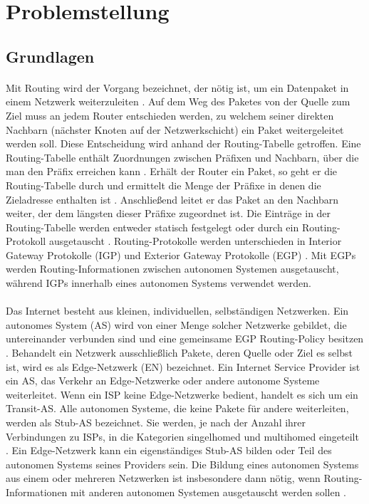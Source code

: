 \section{Problemstellung}

\subsection{Grundlagen}
\paragraph{}
Mit Routing wird der Vorgang bezeichnet, der nötig ist, um ein Datenpaket in einem Netzwerk weiterzuleiten \cite{Mahorta:2002:IR}. Auf dem Weg des Paketes von der Quelle zum Ziel muss an jedem Router entschieden werden, zu welchem seiner direkten Nachbarn (nächster Knoten auf der Netzwerkschicht) ein Paket weitergeleitet werden soll. Diese Entscheidung wird anhand der Routing-Tabelle getroffen. Eine Routing-Tabelle enthält Zuordnungen zwischen Präfixen und Nachbarn, über die man den Präfix erreichen kann \cite{Mahorta:2002:IR}. Erhält der Router ein Paket, so geht er die Routing-Tabelle durch und ermittelt die Menge der Präfixe in denen die Zieladresse enthalten ist \cite{Tanenbaum:2003:CN}. Anschließend leitet er das Paket an den Nachbarn weiter, der dem längsten dieser Präfixe zugeordnet ist. Die Einträge in der Routing-Tabelle werden entweder statisch festgelegt oder durch ein Routing-Protokoll ausgetauscht \cite{Mahorta:2002:IR}. Routing-Protokolle werden unterschieden in Interior Gateway Protokolle (IGP) und Exterior Gateway Protokolle (EGP) \cite{Tanenbaum:2003:CN}. Mit EGPs werden Routing-Informationen zwischen autonomen Systemen ausgetauscht, während IGPs innerhalb eines autonomen Systems  verwendet werden.  %

\paragraph{}
Das Internet besteht aus kleinen, individuellen, selbständigen Netzwerken. Ein autonomes System (AS) wird von einer Menge solcher Netzwerke gebildet, die untereinander verbunden sind und eine gemeinsame EGP Routing-Policy besitzen \cite{hawkinson:1996:autnomousSystems}. Behandelt ein Netzwerk ausschließlich Pakete, deren Quelle oder Ziel es selbst ist,  wird es als Edge-Netzwerk (EN) bezeichnet. Ein Internet Service Provider ist ein AS, das Verkehr an Edge-Netzwerke oder andere autonome Systeme weiterleitet. Wenn ein ISP keine Edge-Netzwerke bedient, handelt es sich um ein Transit-AS. Alle autonomen Systeme, die keine Pakete für andere weiterleiten, werden als Stub-AS bezeichnet. Sie werden, je nach der Anzahl ihrer Verbindungen zu ISPs, in die Kategorien singelhomed und multihomed eingeteilt \cite{Mahorta:2002:IR}. Ein Edge-Netzwerk kann ein eigenständiges Stub-AS bilden oder Teil des autonomen Systems seines Providers sein. Die Bildung eines autonomen Systems aus einem oder mehreren Netzwerken ist insbesondere dann nötig, wenn Routing-Informationen mit anderen autonomen Systemen ausgetauscht werden sollen \cite{hawkinson:1996:autnomousSystems}.

